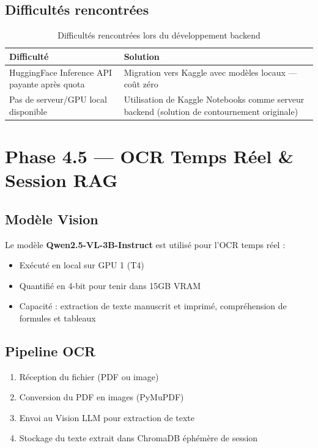 \documentclass[12pt,a4paper]{report}
\begin{document}
\subsection{Difficultés rencontrées}
\begin{table}[h!]
    \centering
    \begin{tabular}{p{6cm} p{8cm}}
        \toprule
        \textbf{Difficulté} & \textbf{Solution} \\
        \midrule
        HuggingFace Inference API payante après quota & Migration vers Kaggle avec modèles locaux — coût zéro \\
        Pas de serveur/GPU local disponible & Utilisation de Kaggle Notebooks comme serveur backend (solution de contournement originale) \\
        \bottomrule
    \end{tabular}
    \caption{Difficultés rencontrées lors du développement backend}
\end{table}

\section{Phase 4.5 — OCR Temps Réel \& Session RAG}

\subsection{Modèle Vision}
Le modèle \textbf{Qwen2.5-VL-3B-Instruct} est utilisé pour l'OCR temps réel :
\begin{itemize}
    \item Exécuté en local sur GPU 1 (T4)
    \item Quantifié en 4-bit pour tenir dans 15GB VRAM
    \item Capacité : extraction de texte manuscrit et imprimé, compréhension de formules et tableaux
\end{itemize}

\subsection{Pipeline OCR}
\begin{enumerate}
    \item Réception du fichier (PDF ou image)
    \item Conversion du PDF en images (PyMuPDF)
    \item Envoi au Vision LLM pour extraction de texte
    \item Stockage du texte extrait dans ChromaDB éphémère de session
\end{enumerate}
\end{document}
